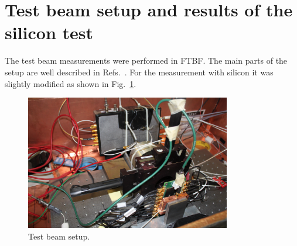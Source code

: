 \documentclass[12pt]{article}
\begin{document}
{%



\section{Test beam setup and results of the silicon test }
\label{sec:tbeam}




The test beam measurements were performed in FTBF. The main parts of the setup are well described in Refs.~\cite{Anderson:2015gha, MCPFastCaloNIMA, Ronzhin2015288,
Ronzhin201552}. For the measurement with silicon it was slightly modified as shown in Fig.~\ref{fig:SiliconPadTBeam}.

\begin{figure}[htbp] 
\centering
\includegraphics[width=0.8\textwidth]{plots/SiliconPadTestBeam.png} 
\caption{Test beam setup.} 
\label{fig:SiliconPadTBeam} 
\end{figure} 

}
\end{document}
